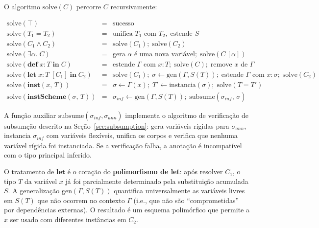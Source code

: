   O algoritmo \(\mathrm{solve}(C)\) percorre \(C\) recursivamente:

  \[
    \begin{array}{rcl} \mathrm{solve}(\top) & = & \text{sucesso} \\
      \mathrm{solve}(T_1 = T_2) & = & \text{unifica } T_1 \text{ com } T_2,\;
      \text{estende } S \\ \mathrm{solve}(C_1 \wedge C_2) & = &
      \mathrm{solve}(C_1);\; \mathrm{solve}(C_2) \\ \mathrm{solve}(\exists
      \alpha.\; C) & = & \text{gera } \alpha \text{ é uma nova variável};\;
      \mathrm{solve}(C\,[\alpha]) \\ \mathrm{solve}(\mathbf{def}\; x : T\;
      \mathbf{in}\; C) & = & \text{estende } \Gamma \text{ com } x : T;\;
      \mathrm{solve}(C);\; \text{remove } x \text{ de } \Gamma \\
      \mathrm{solve}(\mathbf{let}\; x : T\; [C_1]\; \mathbf{in}\; C_2) & = &
      \mathrm{solve}(C_1);\; \sigma \leftarrow \mathrm{gen}(\Gamma, S(T));\;
      \text{estende } \Gamma \text{ com } x : \sigma;\; \mathrm{solve}(C_2) \\
      \mathrm{solve}(\mathbf{inst}(x,\, T)) & = & \sigma \leftarrow
      \Gamma(x);\; T'
      \leftarrow \mathrm{instancia}(\sigma);\; \mathrm{solve}(T = T') \\
      \mathrm{solve}(\mathbf{instScheme}(\sigma,\, T)) & = &
      \sigma_{\mathit{inf}} \leftarrow \mathrm{gen}(\Gamma, S(T));\;
      \mathrm{subsume}(\sigma_{\mathit{inf}},\, \sigma)
  \end{array} \]

  A função auxiliar \(\mathrm{subsume}(\sigma_{\mathit{inf}},
  \sigma_{\mathit{ann}})\)
  implementa o algoritmo de verificação de subsumção descrito na
  Seção~\ref{sec:subsumption}: gera variáveis rígidas para
  \(\sigma_{\mathit{ann}}\), instancia \(\sigma_{\mathit{inf}}\) com variáveis
  flexíveis, unifica os corpos e verifica que nenhuma variável rígida foi
  instanciada.  Se a verificação falha, a anotação é incompatível com o tipo
  principal inferido.

  O tratamento de \(\mathbf{let}\) é o coração do \textbf{polimorfismo
  de let}: após resolver \(C_1\), o tipo \(T\) da variável \(x\) já foi
  parcialmente determinado pela substituição acumulada \(S\). A
  generalização \(\mathrm{gen}(\Gamma, S(T))\) quantifica
  universalmente as variáveis livres em \(S(T)\) que não ocorrem no
  contexto \(\Gamma\) (i.e., que não são ``comprometidas'' por
  dependências externas). O resultado é um esquema polimórfico que
  permite a \(x\) ser usado com diferentes instâncias em \(C_2\).

